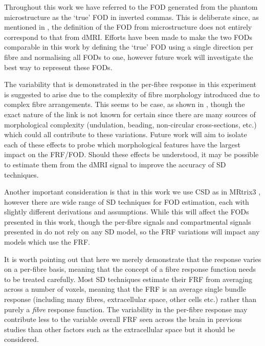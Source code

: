 Throughout this work we have referred to the \ac{FOD} generated from the phantom microstructure as the `true' \ac{FOD} in inverted commas. This is deliberate since, as mentioned in , the definition of the \ac{FOD} from microstructure does not entirely correspond to that from \ac{dMRI}.
Efforts have been made to make the two \acp{FOD} comparable in this work by defining the `true' \ac{FOD} using a single direction per fibre and normalising all \acp{FOD} to one, however future work will investigate the best way to represent these \acp{FOD}.

The variability that is demonstrated in the per-fibre response in this experiment is suggested to arise due to the complexity of fibre morphology introduced due to complex fibre arrangements.
This seems to be case, as shown in , though the exact nature of the link is not known for certain since there are many sources of morphological complexity (undulation, beading, non-circular cross-sections, etc.) which could all contribute to these variations.
Future work will aim to isolate each of these effects to probe which morphological features have the largest impact on the \ac{FRF}/\ac{FOD}. Should these effects be understood, it may be possible to estimate them from the \ac{dMRI} signal to improve the accuracy of \ac{SD} techniques.

Another important consideration is that in this work we use \acl{CSD} as in MRtrix3 \cite{Tournier2019}, however there are wide range of \ac{SD} techniques for \ac{FOD} estimation, each with slightly different derivations and assumptions.
While this will affect the \acp{FOD} presented in this work, though the per-fibre signals and compartmental signals presented in  do not rely on any \ac{SD} model, so the \ac{FRF} variations will impact any models which use the \ac{FRF}.

It is worth pointing out that here we merely demonstrate that the response varies on a per-fibre basis, meaning that the concept of a fibre response function needs to be treated carefully. Most \ac{SD} techniques estimate their \ac{FRF} from averaging across a number of voxels, meaning that the \ac{FRF} is an average single bundle response (including many fibres, extracellular space, other cells etc.) rather than purely a \emph{fibre} response function.
The variability in the per-fibre response may contribute less to the variable overall \ac{FRF} seen across the brain in previous studies \cite{Schilling2019,Christiaens2020} than other factors such as the extracellular space but it should be considered. 

